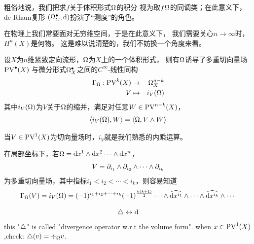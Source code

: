 粗俗地说，我们把求$f$关于体积形式$\Omega$的积分
视为取$f\Omega$的同调类；在此意义下，de Rham复形
$(\Omega_C^{\bullet},\mathrm{d})$扮演了“测度”的角色。




在物理上我们常要面对无穷维空间，于是在此意义下，
我们需要关心$n\to\infty$时，$H^n(X)$是何物。
这是难以说清楚的，我们不妨换一个角度来看。


\begin{definition}
设$X$为$n$维紧致定向流形，$\Omega$为$X$上的一个体积形式，
则有$\Omega$诱导了多重切向量场$\operatorname{PV}^{\bullet}(X)$
与微分形式$\Omega_X^{\bullet}$之间的$C^{\infty}$-线性同构
\begin{eqnarray*}
\Gamma_\Omega:\operatorname{PV}^k(X)&\to&\Omega^{n-k}_X\\
V&\mapsto& i_V(\Omega)
\end{eqnarray*}
其中$i_V(\Omega)$为$V$关于$\Omega$的缩并，满足对任意$W\in\operatorname{PV}^{n-k}(X)$，
$$\langle i_V(\Omega),W\rangle=\langle\Omega,V\wedge W\rangle$$
\end{definition}
当$V\in\operatorname{PV}^1(X)$为切向量场时，$i_V$就是我们熟悉的内乘运算。

在局部坐标下，若$\Omega=\mathrm{d} x^1\wedge\mathrm{d} x^2\cdots\wedge\mathrm{d} x^n$，
$$V=\partial_{i_1}\wedge\partial_{i_2}\wedge\cdots\wedge\partial_{i_k}$$
为多重切向量场，其中指标$i_1<i_2<\cdots<i_k$，则容易知道
$$
  \Gamma_\Omega(V)=i_V(\Omega)
= (-1)^{i_1+i_2+\cdots+i_k}(-1)^{\frac{k(k+1)}{2}}
  \cdots\wedge\widehat{\mathrm{d} x^{i_1}}\wedge\cdots\wedge\widehat{\mathrm{d} x^{i_k}}\wedge\cdots
$$

$$\triangle\leftrightarrow \mathrm{d}$$
this "$\triangle$" is called "divergence operator w.r.t the volume form".
when $x\in\operatorname{PV}^1(X)$,check: $\triangle(v)=\div_{\Omega}v$.

